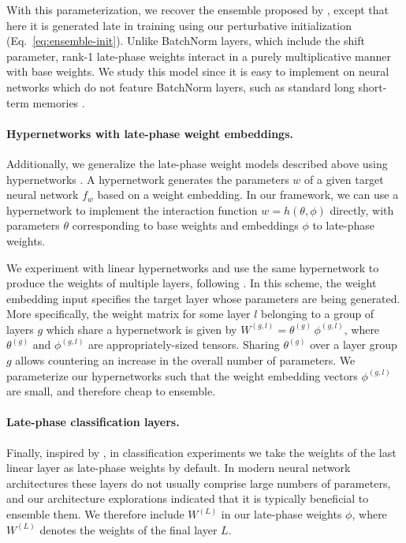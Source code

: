 \documentclass{article} \usepackage{iclr2021_conference,times}
\begin{document}
With this parameterization, we recover the ensemble proposed by \citet{wen_batchensemble_2020}, except that here it is generated late in training using our perturbative initialization (Eq.~\ref{eq:ensemble-init}). Unlike BatchNorm layers, which include the shift parameter, rank-1 late-phase weights interact in a purely multiplicative manner with base weights. We study this model since it is easy to implement on neural networks which do not feature BatchNorm layers, such as standard long short-term memories \citep[LSTMs;][]{hochreiter_long_1997}.

\paragraph{Hypernetworks with late-phase weight embeddings.} Additionally, we generalize the late-phase weight models described above using hypernetworks \citep[][]{ha_hypernetworks_2017}. A hypernetwork generates the parameters $w$ of a given target neural network $f_w$ based on a weight embedding. In our framework, we can use a hypernetwork to implement the interaction function $w = h(\theta, \phi)$ directly, with parameters $\theta$ corresponding to base weights and embeddings $\phi$ to late-phase weights.

We experiment with linear hypernetworks and use the same hypernetwork to produce the weights of multiple layers, following \citet{savarese_learning_2019,ha_hypernetworks_2017,von_oswald_continual_2020}. In this scheme, the weight embedding input specifies the target layer whose parameters are being generated.  More specifically, the weight matrix for some layer $l$ belonging to a group of layers $g$ which share a hypernetwork is given by $W^{(g,l)} = \theta^{(g)} \, \phi^{(g,l)}$, where $\theta^{(g)}$ and $\phi^{(g,l)}$ are appropriately-sized tensors. Sharing $\theta^{(g)}$ over a layer group $g$ allows countering an increase in the overall number of parameters. We parameterize our hypernetworks such that the weight embedding vectors  $\phi^{(g,l)}$ are small, and therefore cheap to ensemble.

\paragraph{Late-phase classification layers.} Finally, inspired by \citet{lee_why_2015}, in classification experiments we take the weights of the last linear layer as late-phase weights by default. In modern neural network architectures these layers do not usually comprise large numbers of parameters, and our architecture explorations indicated that it is typically beneficial to ensemble them. We therefore include $W^{(L)}$ in our late-phase weights $\phi$, where $W^{(L)}$ denotes the weights of the final layer $L$.
\end{document}
